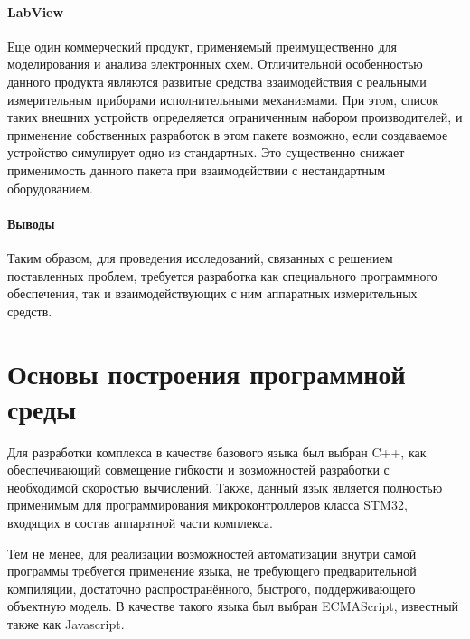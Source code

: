 \paragraph{LabView}

Еще один коммерческий продукт, применяемый преимущественно для
моделирования и анализа электронных схем. Отличительной особенностью
данного продукта являются развитые средства взаимодействия
с реальными измерительным приборами исполнительными механизмами.
При этом, список таких внешних устройств определяется
ограниченным набором производителей, и применение собственных
разработок в этом пакете возможно, если создаваемое устройство
симулирует одно из стандартных. Это существенно снижает применимость
данного пакета при взаимодействии с нестандартным оборудованием.



\paragraph{Выводы}

Таким образом, для проведения исследований, связанных с решением
поставленных проблем, требуется разработка как специального программного
обеспечения, так и взаимодействующих с ним аппаратных измерительных средств.




%




\section{Основы построения программной среды} %

Для разработки комплекса в качестве базового языка был выбран C++,
как обеспечивающий совмещение гибкости и возможностей разработки
с необходимой скоростью вычислений. Также, данный язык
является полностью применимым для программирования микроконтроллеров
класса STM32, входящих в состав аппаратной части комплекса.

Тем не менее, для реализации возможностей автоматизации
внутри самой программы требуется применение языка,
не требующего предварительной компиляции, достаточно распространённого,
быстрого, поддерживающего объектную модель.
В качестве такого языка был выбран ECMAScript, известный также
как Javascript.

